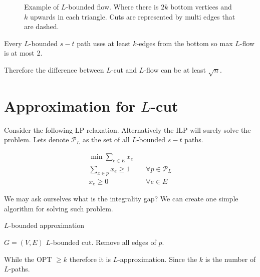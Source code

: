 \begin{figure}[!ht]
	\caption{Example of $L$-bounded flow. Where there is $2k$ bottom vertices and $k$ upwards in each triangle. Cuts are represented by multi edges that are dashed.}
	\label{l-bounded flow}
\end{figure}

\begin{observ}
	Every $L$-bounded $s-t$ path uses at least $k$-edges from the bottom so max $L$-flow is at most 2.
\end{observ}

Therefore the difference between $L$-cut and $L$-flow can be at least $\sqrt{n}$.

\section{Approximation for $L$-cut}

Consider the following LP relaxation. Alternatively the ILP will surely solve the problem. Lets denote $\mathcal{P}_L$ as the set of all $L$-bounded $s-t$ paths.

$$
\begin{aligned}
	\min \sum_{e \in E} x_e & \\
	\sum_{x \in p} x_e \geq 1 & \quad \forall p \in \mathcal{P}_L \\
	x_e \geq 0 & \quad \forall e \in E
\end{aligned}
$$

We may ask ourselves what is the integrality gap? We can create one simple algorithm for solving such problem.

\begin{algorithm}
	\caption{$L$-bounded approximation}
	\begin{algorithmic}[1]
		\Require $G = (V,E)$
		\Ensure $L$-bounded cut.
			\State Remove all edges of $p$.
		\EndWhile
	\end{algorithmic}
\end{algorithm}

\begin{observ}
	While the OPT $\geq k$ therefore it is $L$-approximation. Since the $k$ is the number of $L$-paths.
\end{observ}